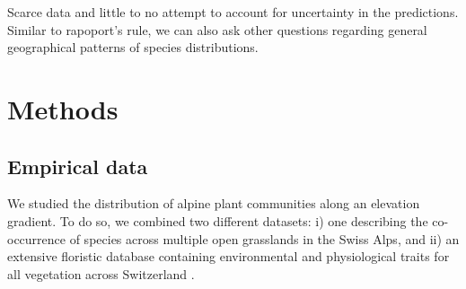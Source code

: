 \documentclass[11pt, a4paper]{article}
\begin{document}
Scarce data and little to no attempt to account for uncertainty in the predictions. Similar to rapoport's rule, we can also ask other questions regarding general geographical patterns of species distributions. 

\section*{Methods}
\subsection*{Empirical data}
We studied the distribution of alpine plant communities along an elevation gradient. To do so, we combined two different datasets: i) one describing the co-occurrence of species across multiple open grasslands in the Swiss Alps, and ii) an extensive floristic database containing environmental and physiological traits for all vegetation across Switzerland \citep{landoltFloraIndicativaOkologische2010}. 
\end{document}
